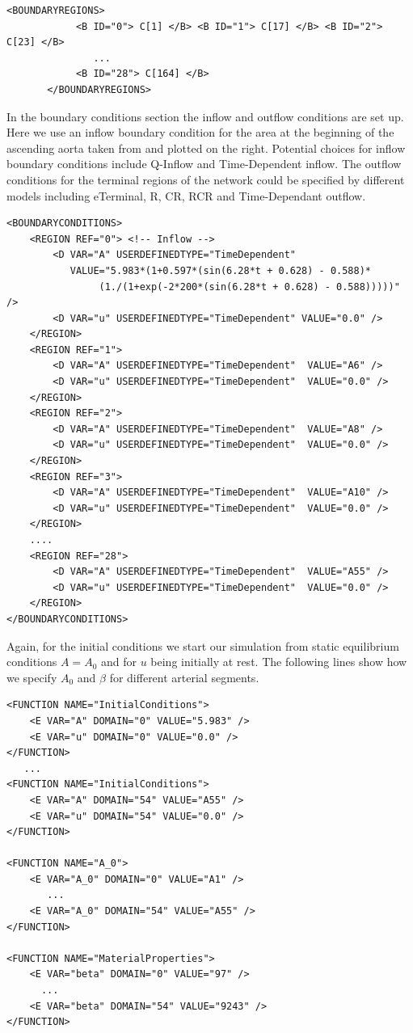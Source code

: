 \begin{lstlisting}[style=XmlStyle]
        <BOUNDARYREGIONS>
            <B ID="0"> C[1] </B> <B ID="1"> C[17] </B> <B ID="2"> C[23] </B>
               ...
            <B ID="28"> C[164] </B>
       </BOUNDARYREGIONS>
\end{lstlisting}

In the boundary conditions section the inflow and outflow conditions are set up.
Here we use an inflow boundary condition for the area at the beginning of
the ascending aorta taken from \cite{ShFoPeFr03} and plotted on the
right. Potential choices for inflow boundary conditions include Q-Inflow
and Time-Dependent inflow. The outflow conditions for the terminal regions of
the network could be specified by different models including eTerminal, R, CR,
RCR and Time-Dependant outflow.

\begin{lstlisting}[style=XmlStyle]
<BOUNDARYCONDITIONS>
    <REGION REF="0"> <!-- Inflow -->
        <D VAR="A" USERDEFINEDTYPE="TimeDependent" 
           VALUE="5.983*(1+0.597*(sin(6.28*t + 0.628) - 0.588)*
                (1./(1+exp(-2*200*(sin(6.28*t + 0.628) - 0.588)))))" />
        <D VAR="u" USERDEFINEDTYPE="TimeDependent" VALUE="0.0" />
    </REGION>
    <REGION REF="1">  
        <D VAR="A" USERDEFINEDTYPE="TimeDependent"  VALUE="A6" />
        <D VAR="u" USERDEFINEDTYPE="TimeDependent"  VALUE="0.0" />
    </REGION>            
    <REGION REF="2"> 
        <D VAR="A" USERDEFINEDTYPE="TimeDependent"  VALUE="A8" />
        <D VAR="u" USERDEFINEDTYPE="TimeDependent"  VALUE="0.0" />
    </REGION>
    <REGION REF="3">   
        <D VAR="A" USERDEFINEDTYPE="TimeDependent"  VALUE="A10" />
        <D VAR="u" USERDEFINEDTYPE="TimeDependent"  VALUE="0.0" />
    </REGION>
    ....
    <REGION REF="28"> 
        <D VAR="A" USERDEFINEDTYPE="TimeDependent"  VALUE="A55" />
        <D VAR="u" USERDEFINEDTYPE="TimeDependent"  VALUE="0.0" />
    </REGION>
</BOUNDARYCONDITIONS>
\end{lstlisting}

Again, for the initial conditions we start our simulation from static
equilibrium conditions $A = A_0$ and for $u$ being initially at rest. The
following lines show how we specify $A_0$ and $\beta$ for different arterial
segments.
\begin{lstlisting}[style=XmlStyle]
<FUNCTION NAME="InitialConditions">
    <E VAR="A" DOMAIN="0" VALUE="5.983" />
    <E VAR="u" DOMAIN="0" VALUE="0.0" />
</FUNCTION>
   ...
<FUNCTION NAME="InitialConditions">
    <E VAR="A" DOMAIN="54" VALUE="A55" />
    <E VAR="u" DOMAIN="54" VALUE="0.0" />
</FUNCTION>

<FUNCTION NAME="A_0">
    <E VAR="A_0" DOMAIN="0" VALUE="A1" />
       ...
    <E VAR="A_0" DOMAIN="54" VALUE="A55" />
</FUNCTION>

<FUNCTION NAME="MaterialProperties"> 
    <E VAR="beta" DOMAIN="0" VALUE="97" />
      ...
    <E VAR="beta" DOMAIN="54" VALUE="9243" />
</FUNCTION>
\end{lstlisting}


